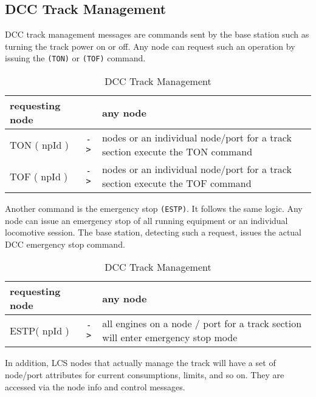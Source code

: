 \subsection{DCC Track Management}

DCC track management messages are commands sent by the base station such as turning the track power on or off. Any node can request such an operation by issuing the \texttt{(TON)} or \texttt{(TOF)} command.

\begin{table}[ht!]
    \begin{center}
        \caption{DCC Track Management}
        \begin{tabular}{|p{}| c |p{}|}
            \toprule
            \textbf{requesting node} & & \textbf{ any node} \\
            \midrule
            TON ( npId ) & \texttt{->} & nodes or an individual node/port for a track section execute the TON command  \\
            \midrule
            TOF ( npId ) & \texttt{->} & nodes or an individual node/port for a track section execute the TOF command \\
            \bottomrule
        \end{tabular}
    \end{center}
\end{table}

Another command is the emergency stop \texttt{(ESTP)}. It follows the same logic. Any node can issue an emergency stop of all running equipment or an individual locomotive session. The base station, detecting such a request, issues the actual DCC emergency stop command. 

\begin{table}[ht!]
    \begin{center}
        \caption{DCC Track Management}
        \begin{tabular}{|p{}| c |p{}|}
            \toprule
            \textbf{requesting node} & & \textbf{ any node} \\
            \midrule
            ESTP( npId ) & \texttt{->} & all engines on a node / port for a track section will enter emergency stop mode  \\
            \bottomrule
        \end{tabular}
    \end{center}
\end{table}

In addition, LCS nodes that actually manage the track will have a set of node/port attributes for current consumptions, limits, and so on. They are accessed via the node info and control messages.

